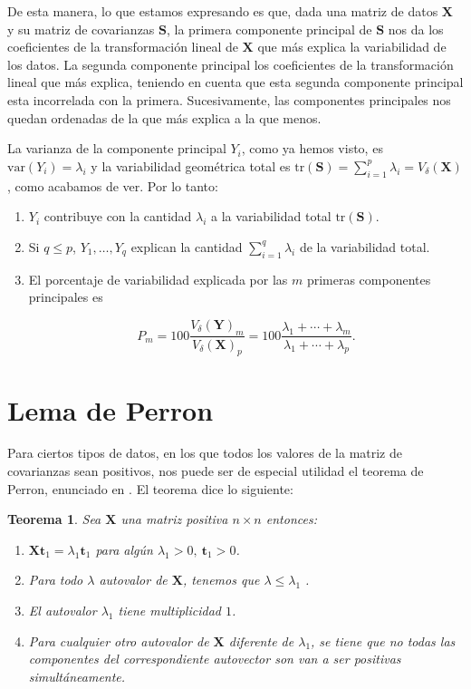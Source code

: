 \documentclass[tfg,cienciasbased,lot,lof,covers,final,overleaf,nocopyright]{tfgtfmthesisuam}
\newtheorem{teor}{Teorema}[chapter]
\begin{document}
De esta manera, lo que estamos expresando es que, dada una matriz de datos $\mathbf{X}$ y su matriz de covarianzas $\mathbf{S}$, la primera componente principal de $\mathbf{S}$ nos da los coeficientes de la transformación lineal de $\mathbf{X}$ que más explica la variabilidad de los datos. La segunda componente principal los coeficientes de la transformación lineal que más explica, teniendo en cuenta que esta segunda componente principal esta incorrelada con la primera. Sucesivamente, las componentes principales nos quedan ordenadas de la que más explica a la que menos.

La varianza de la componente principal $Y_i$, como ya hemos visto, es $\mbox{var}(Y_i) = \lambda_i$ y la variabilidad geométrica total es $\mbox{tr}(\mathbf{S}) = \sum_{i=1}^p \lambda_i = V_{\delta}(\mathbf{X})$, como acabamos de ver. Por lo tanto:
\begin{enumerate}
    \item $Y_i$ contribuye con la cantidad $\lambda_i$ a la variabilidad total $\mbox{tr}(\mathbf{S}).$
    \item Si $q \leq p$, $Y_1, \ldots, Y_q$ explican la cantidad $\sum_{i=1}^q \lambda_i$ de la variabilidad total.
    \item El porcentaje de variabilidad explicada por las $m$ primeras componentes principales es
    
    $$P_m = 100 \frac{V_{\delta}(\mathbf{Y})_m}{V_{\delta}(\mathbf{X})_p} = 100 \frac{\lambda_1 + \cdots + \lambda_m}{\lambda_1 + \cdots + \lambda_p}.$$
\end{enumerate}

\section{Lema de Perron}

Para ciertos tipos de datos, en los que todos los valores de la matriz de covarianzas sean positivos, nos puede ser de especial utilidad el teorema de Perron, enunciado en \cite{Bapat}. El teorema dice lo siguiente:

\begin{teor}
    Sea $\mathbf{X}$ una matriz positiva $n \times n$ entonces:
    \begin{enumerate}
        \item $\mathbf{X}\mathbf{t}_1 = \lambda_1\mathbf{t}_1$ para algún $\lambda_1 >0,\ \mathbf{t}_1 > 0$.
        \item Para todo $\lambda$ autovalor de $\mathbf{X}$, tenemos que $\lambda \leq \lambda_1$ .
        \item El autovalor $\lambda_1$ tiene multiplicidad $1$.
        \item Para cualquier otro autovalor de $\mathbf{X}$ diferente de $\lambda_1$, se tiene que no todas las componentes del correspondiente autovector son van a ser positivas simultáneamente.
    \end{enumerate}
\end{teor}
\end{document}
